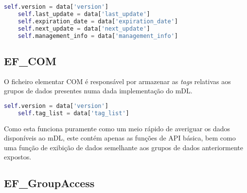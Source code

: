 \begin{lstlisting}[caption=Instanciação dos dados do DG10, language=Python]
    self.version = data['version']
    self.last_update = data['last_update']
    self.expiration_date = data['expiration_date']
    self.next_update = data['next_update']
    self.management_info = data['management_info']
\end{lstlisting}


\subsection{EF_COM}

O ficheiro elementar COM é responsável por armazenar as \textit{tags} relativas aos grupos de dados presentes numa dada implementação do mDL.

\begin{lstlisting}[caption=Instanciação de variáveis no EF.COM, language=Python]
    self.version = data['version']
    self.tag_list = data['tag_list']
\end{lstlisting}

Como esta funciona puramente como um meio rápido de averiguar os dados disponíveis ao mDL, este contém apenas as funções de API básica, bem como uma função de exibição de dados semelhante aos grupos de dados anteriormente expostos.


\subsection{EF_GroupAccess}

